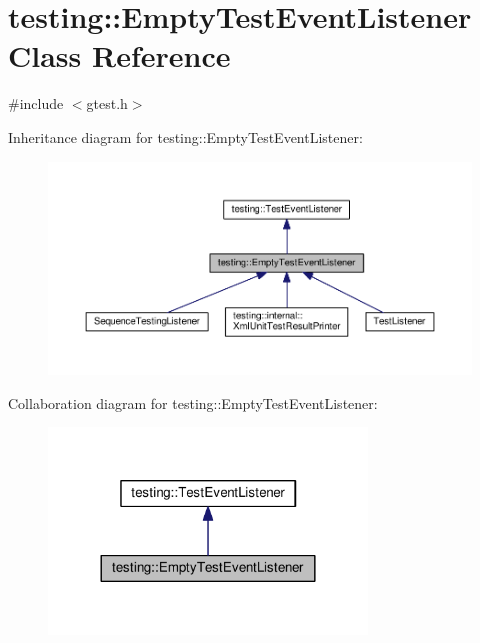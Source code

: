 \hypertarget{classtesting_1_1_empty_test_event_listener}{}\section{testing\+:\+:Empty\+Test\+Event\+Listener Class Reference}
\label{classtesting_1_1_empty_test_event_listener}


{\ttfamily \#include $<$gtest.\+h$>$}



Inheritance diagram for testing\+:\+:Empty\+Test\+Event\+Listener\+:
\nopagebreak
\begin{figure}[H]
\begin{center}
\leavevmode
\includegraphics[width=350pt]{classtesting_1_1_empty_test_event_listener__inherit__graph}
\end{center}
\end{figure}


Collaboration diagram for testing\+:\+:Empty\+Test\+Event\+Listener\+:
\nopagebreak
\begin{figure}[H]
\begin{center}
\leavevmode
\includegraphics[width=240pt]{classtesting_1_1_empty_test_event_listener__coll__graph}
\end{center}
\end{figure}

